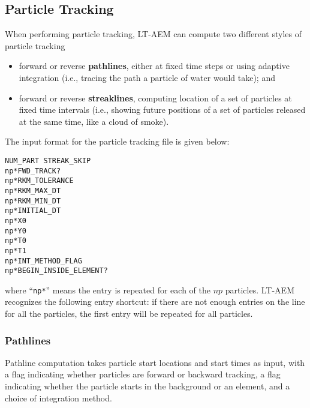 \documentclass[12pt,letterpaper]{article}
\begin{document}
\subsection{Particle Tracking}
When performing particle tracking, LT-AEM can compute two different
styles of particle tracking
\begin{itemize}
\item forward or reverse \textbf{pathlines}, either at fixed time steps or
  using adaptive integration (i.e., tracing the path a particle of
  water would take); and
\item forward or reverse \textbf{streaklines}, computing location of a set of
  particles at fixed time intervals (i.e., showing future positions of
  a set of particles released at the same time, like a cloud of
  smoke).
\end{itemize}

The input format for the particle tracking file is given below:
\begin{verbatim}
NUM_PART STREAK_SKIP
np*FWD_TRACK?
np*RKM_TOLERANCE
np*RKM_MAX_DT
np*RKM_MIN_DT
np*INITIAL_DT
np*X0
np*Y0
np*T0
np*T1
np*INT_METHOD_FLAG
np*BEGIN_INSIDE_ELEMENT?
\end{verbatim}
where ``\texttt{np*}'' means the entry is repeated for each of the $np$
particles.  LT-AEM recognizes the following entry shortcut: if there
are not enough entries on the line for all the particles, the first
entry will be repeated for all particles.

\subsubsection{Pathlines}
Pathline computation takes particle start locations and start times as
input, with a flag indicating whether particles are forward or
backward tracking, a flag indicating whether the particle starts in
the background or an element, and a choice of integration method.
\end{document}
